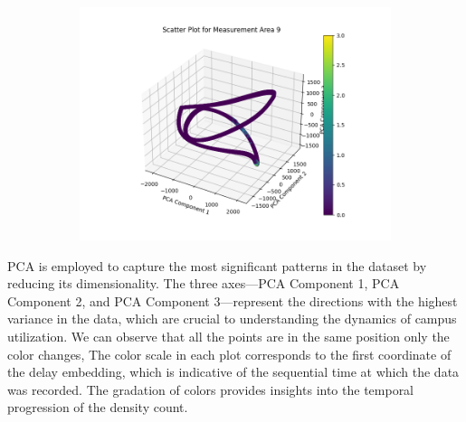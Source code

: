 \begin{itemize}
\begin{figure}[H]
\begin{subfigure}{0.3\textwidth}
        \includegraphics[width=\linewidth]
        {images/task5_2_9.png}
        \label{task5_2_9}
    \end{subfigure}
    \caption{}
    \label{fig:task5_2}
\end{figure}

PCA is employed to capture the most significant patterns in the dataset by reducing its dimensionality. The three axes—PCA Component 1, PCA Component 2, and PCA Component 3—represent the directions with the highest variance in the data, which are crucial to understanding the dynamics of campus utilization. We can observe that all the points are in the same position only the color changes, The color scale in each plot corresponds to the first coordinate of the delay embedding, which is indicative of the sequential time at which the data was recorded. The gradation of colors provides insights into the temporal progression of the density count.


\end{itemize}

